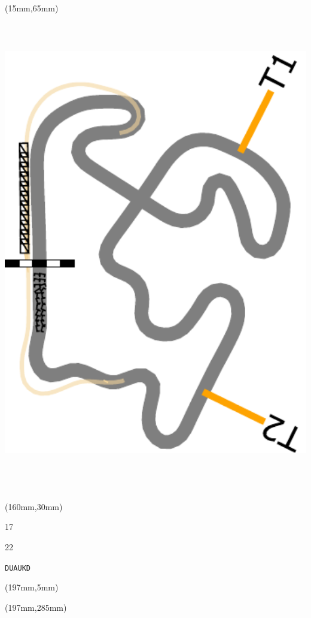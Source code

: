 \begin{textblock*}{185mm}(15mm,65mm)%
\centering
\mbox{\includegraphics[width=185mm,height=210mm,keepaspectratio]{PT/DUAUKD.pdf}}
\end{textblock*}
\begin{textblock*}{40mm}(160mm,30mm)%
\Large
\par{} 
\par17 
\par22 
\par\hfill\tiny\tt DUAUKD\\
\end{textblock*}
\begin{textblock*}{20mm}(197mm,5mm)%
\fbox{\thepage}
\label{DUAUKD}
\end{textblock*}
\begin{textblock*}{20mm}(197mm,285mm)%
\fbox{\thepage}
\end{textblock*}

